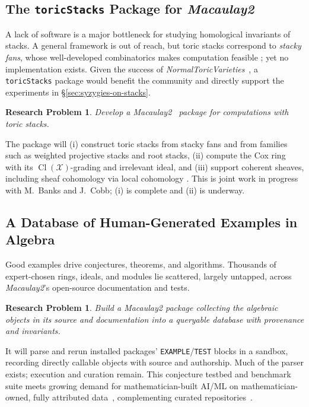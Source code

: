 \documentclass[11pt,reqno]{amsart}
\newtheorem{problem}[lemma]{Research Problem}
\theoremstyle{remark}
\newcommand{\Cl}{\operatorname{Cl}}
\newcommand{\cX}{\mathcal{X}}
\begin{document}
 \subsection{The \texttt{toricStacks} Package for \textit{Macaulay2}}

A lack of software is a major bottleneck for studying homological invariants of stacks. A general framework is out of reach, but toric stacks correspond to \emph{stacky fans}, whose well-developed combinatorics makes computation feasible \cite{toricStacks1,toricStacks2,borisovChenSmith05}; yet no implementation exists. Given the success of \textit{NormalToricVarieties}~\cite{NormalToricVarietiesSource}, a \texttt{toricStacks} package would benefit the community and directly support the experiments in \S\ref{sec:syzygies-on-stacks}.

\begin{problem}\label{prob:toric-stacks-m2}
Develop a \textit{Macaulay2}~\cite{M2} package for computations with toric stacks.
\end{problem}

The package will (i) construct toric stacks from stacky fans and from families such as weighted projective stacks and root stacks, (ii) compute the Cox ring with its $\Cl(\cX)$-grading and irrelevant ideal, and (iii) support coherent sheaves, including sheaf cohomology via local cohomology \cite{EMS00}. This is joint work in progress with M.~Banks and J.~Cobb; (i) is complete and (ii) is underway.

 \subsection{A Database of Human-Generated Examples in Algebra}
Good examples drive conjectures, theorems, and algorithms. Thousands of expert-chosen rings, ideals, and modules lie scattered, largely untapped, across \textit{Macaulay2}'s open-source documentation and tests.
 
\begin{problem}\label{prob:database-m2}
	Build a \textit{Macaulay2} package collecting the algebraic objects in its source and documentation into a queryable database with provenance and invariants.
\end{problem}

It will parse and rerun installed packages' \texttt{EXAMPLE}/\texttt{TEST} blocks in a sandbox, recording directly callable objects with source and authorship. Much of the parser exists; execution and curation remain. This conjecture testbed and benchmark suite meets growing demand for mathematician-built AI/ML on mathematician-owned, fully attributed data~\cite{commelin26}, complementing curated repositories~\cite{LMFDB,fevolaGoergen22}.
\end{document}

